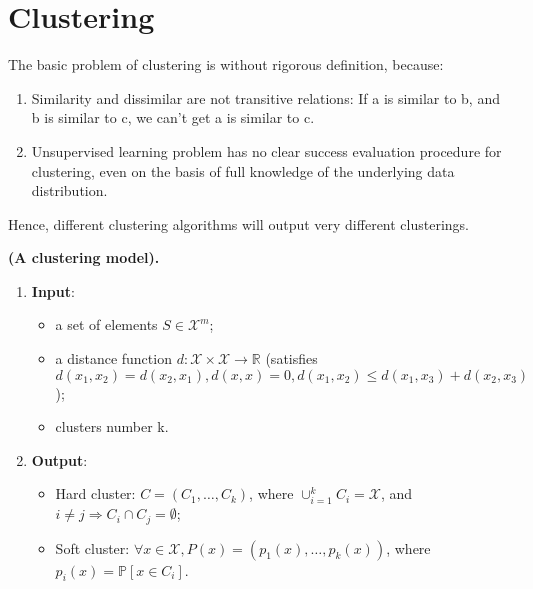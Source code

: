 
\section{Clustering}%
\label{sec:clustering}

The basic problem of clustering is without rigorous definition, because:
\begin{enumerate}
    \item Similarity and dissimilar are not transitive relations: If a is similar to b, and b is similar to c, we can't get a is similar to c.
    \item Unsupervised learning problem has no clear success evaluation procedure for clustering, even on the basis of full knowledge of the underlying data distribution.
\end{enumerate}

Hence, different clustering algorithms will output very different clusterings.

\begin{definition}
    \textbf{(A clustering model).}
    \begin{enumerate}
        \item \textbf{Input}:
            \begin{itemize}
                \item a set of elements $ S \in \mathcal{X}^m $; 
                \item a distance function $ d:\mathcal{X} \times \mathcal{X} \rightarrow \mathbb{R} $ (satisfies $ d(x_1, x_2) = d(x_2, x_1), d(x, x) = 0, d(x_1, x_2) \le d(x_1, x_3) + d(x_2, x_3)$);
                \item clusters number k.
            \end{itemize}
        \item \textbf{Output}:
            \begin{itemize}
                \item Hard cluster: $ C = (C_1, \ldots, C_k) $, where $ \cup^k_{i=1} C_i = \mathcal{X} $, and $ i \ne j \Rightarrow C_i \cap C_j = \emptyset $;
                \item Soft cluster: $ \forall x \in \mathcal{X}, P(x) = (p_1(x), \ldots, p_k(x)) $, where $ p_i(x) = \mathbb{P} \left[ x \in C_i \right] $.
            \end{itemize}
    \end{enumerate}
\end{definition}

